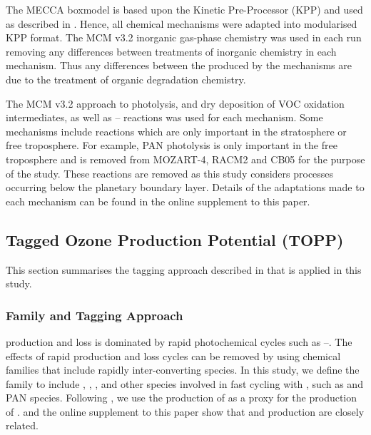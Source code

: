The MECCA boxmodel \citep{Sander:2005} is based upon the Kinetic Pre-Processor (KPP) \citep{Damian:2002} and used as described in \citet{Butler:2011}. 
Hence, all chemical mechanisms were adapted into modularised KPP format.
The MCM v3.2 inorganic gas-phase chemistry was used in each run removing any differences between treatments of inorganic chemistry in each mechanism.
Thus any differences between the  produced by the mechanisms are due to the treatment of organic degradation chemistry.

The MCM v3.2 approach to photolysis, and dry deposition of VOC oxidation intermediates, as well as -- reactions was used for each mechanism.
Some mechanisms include reactions which are only important in the stratosphere or free troposphere.
For example, PAN photolysis is only important in the free troposphere \citep{Harwood:2003} and is removed from MOZART-4, RACM2 and CB05 for the purpose of the study. 
These reactions are removed as this study considers processes occurring below the planetary boundary layer.
Details of the adaptations made to each mechanism can be found in the online supplement to this paper.

\subsection{Tagged Ozone Production Potential (TOPP)}
This section summarises the tagging approach described in \citet{Butler:2011} that is applied in this study.

\subsubsection[Ox Family and Tagging Approach]{ Family and Tagging Approach} \label{ss:tagging} %
%
 production and loss is dominated by rapid photochemical cycles such as --.
The effects of rapid production and loss cycles can be removed by using chemical families that include rapidly inter-converting species.
In this study, we define the  family to include , , ,  and other species involved in fast cycling with , such as  and PAN species.
Following \citet{Butler:2011}, we use the production of  as a proxy for the production of .
\citet{Butler:2011} and the online supplement to this paper show that  and  production are closely related.


